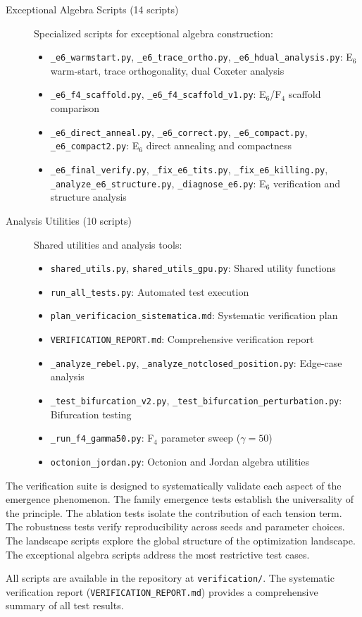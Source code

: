 \begin{description}
\item[Exceptional Algebra Scripts (14 scripts)] Specialized scripts for exceptional algebra construction:
\begin{itemize}
\item \texttt{\_e6\_warmstart.py}, \texttt{\_e6\_trace\_ortho.py}, \texttt{\_e6\_hdual\_analysis.py}: E$_6$ warm-start, trace orthogonality, dual Coxeter analysis
\item \texttt{\_e6\_f4\_scaffold.py}, \texttt{\_e6\_f4\_scaffold\_v1.py}: E$_6$/F$_4$ scaffold comparison
\item \texttt{\_e6\_direct\_anneal.py}, \texttt{\_e6\_correct.py}, \texttt{\_e6\_compact.py}, \texttt{\_e6\_compact2.py}: E$_6$ direct annealing and compactness
\item \texttt{\_e6\_final\_verify.py}, \texttt{\_fix\_e6\_tits.py}, \texttt{\_fix\_e6\_killing.py}, \texttt{\_analyze\_e6\_structure.py}, \texttt{\_diagnose\_e6.py}: E$_6$ verification and structure analysis
\end{itemize}

\item[Analysis Utilities (10 scripts)] Shared utilities and analysis tools:
\begin{itemize}
\item \texttt{shared\_utils.py}, \texttt{shared\_utils\_gpu.py}: Shared utility functions
\item \texttt{run\_all\_tests.py}: Automated test execution
\item \texttt{plan\_verificacion\_sistematica.md}: Systematic verification plan
\item \texttt{VERIFICATION\_REPORT.md}: Comprehensive verification report
\item \texttt{\_analyze\_rebel.py}, \texttt{\_analyze\_notclosed\_position.py}: Edge-case analysis
\item \texttt{\_test\_bifurcation\_v2.py}, \texttt{\_test\_bifurcation\_perturbation.py}: Bifurcation testing
\item \texttt{\_run\_f4\_gamma50.py}: F$_4$ parameter sweep ($\gamma = 50$)
\item \texttt{octonion\_jordan.py}: Octonion and Jordan algebra utilities
\end{itemize}
\end{description}

The verification suite is designed to systematically validate each aspect of the emergence phenomenon. The family emergence tests establish the universality of the principle. The ablation tests isolate the contribution of each tension term. The robustness tests verify reproducibility across seeds and parameter choices. The landscape scripts explore the global structure of the optimization landscape. The exceptional algebra scripts address the most restrictive test cases.

All scripts are available in the repository at \texttt{verification/}. The systematic verification report (\texttt{VERIFICATION\_REPORT.md}) provides a comprehensive summary of all test results.

